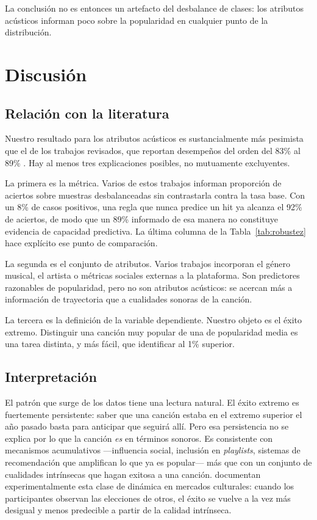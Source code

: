\documentclass[11pt,a4paper]{article}
\begin{document}
La conclusión no es entonces un artefacto del desbalance de clases: los
atributos acústicos informan poco sobre la popularidad en cualquier punto de
la distribución.

\section{Discusión}

\subsection{Relación con la literatura}

Nuestro resultado para los atributos acústicos es sustancialmente más
pesimista que el de los trabajos revisados, que reportan desempeños del orden
del 83\% al 89\% \citep{pareek2022,dimolitsas2023}. Hay al menos tres
explicaciones posibles, no mutuamente excluyentes.

La primera es la métrica. Varios de estos trabajos informan proporción de
aciertos sobre muestras desbalanceadas sin contrastarla contra la tasa base.
Con un 8\% de casos positivos, una regla que nunca predice un hit ya alcanza
el 92\% de aciertos, de modo que un 89\% informado de esa manera no
constituye evidencia de capacidad predictiva. La última columna de la
Tabla~\ref{tab:robustez} hace explícito ese punto de comparación.

La segunda es el conjunto de atributos. Varios trabajos incorporan el género
musical, el artista o métricas sociales externas a la plataforma. Son
predictores razonables de popularidad, pero no son atributos acústicos: se
acercan más a información de trayectoria que a cualidades sonoras de la
canción.

La tercera es la definición de la variable dependiente. Nuestro objeto es el
éxito extremo. Distinguir una canción muy popular de una de popularidad media
es una tarea distinta, y más fácil, que identificar al 1\% superior.

\subsection{Interpretación}

El patrón que surge de los datos tiene una lectura natural. El éxito extremo
es fuertemente persistente: saber que una canción estaba en el extremo
superior el año pasado basta para anticipar que seguirá allí. Pero esa
persistencia no se explica por lo que la canción \textit{es} en términos
sonoros. Es consistente con mecanismos acumulativos ---influencia social,
inclusión en \textit{playlists}, sistemas de recomendación que amplifican lo
que ya es popular--- más que con un conjunto de cualidades intrínsecas que
hagan exitosa a una canción. \citet{salganik2006} documentan
experimentalmente esta clase de dinámica en mercados culturales: cuando los
participantes observan las elecciones de otros, el éxito se vuelve a la vez
más desigual y menos predecible a partir de la calidad intrínseca.
\end{document}
